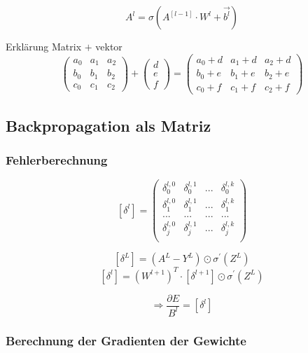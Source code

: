 \documentclass{article}
\begin{document}
 \[ A^l = \sigma (A^{[l-1]} \cdot W^l + \vec{b^l}) \]

Erklärung Matrix $+$ vektor
 \[ \begin{pmatrix}
    a_0 & a_1 & a_2 \\
    b_0 & b_1 & b_2 \\
    c_0 & c_1 & c_2
 \end{pmatrix} 
 + \begin{pmatrix}
    d \\ e \\ f
 \end{pmatrix} 
 = \begin{pmatrix}
    a_0 + d & a_1 + d & a_2 + d\\
    b_0 + e & b_1 + e & b_2 + e \\
    c_0 + f & c_1 + f & c_2 + f
 \end{pmatrix}\]


 \subsection{Backpropagation als Matriz}

 \subsubsection{Fehlerberechnung}

 \[ [\delta^l] =
 \begin{pmatrix}
    \delta_0^{l,0} & \delta_0^{l,1} & ... & \delta_0^{l,k} \\
    \delta_1^{l,0} & \delta_1^{l,1} & ... & \delta_1^{l,k} \\
    ... & ... & ... & ... \\
    \delta_j^{l,0} & \delta_j^{l,1} & ... & \delta_j^{l,k} \\
 \end{pmatrix} \]

  \[ [\delta^L] = (A^L - Y^L) \odot \sigma^{\prime}(Z^L) \]
 \[ [\delta^l] = (W^{l+1})^T \cdot [\delta^{l+1}] \odot \sigma^{\prime}(Z^L) \]

 \[ \Rightarrow  \frac{\partial E}{B^l} = [\delta^l]\]


\pagebreak


 \subsubsection{Berechnung der Gradienten der Gewichte}
\end{document}
